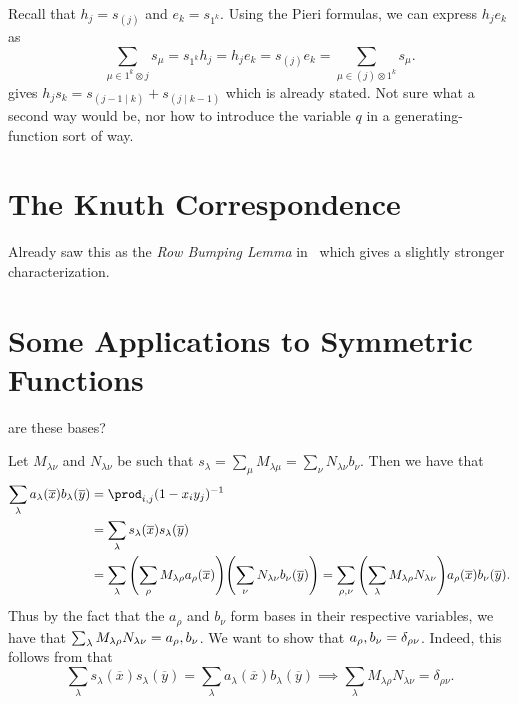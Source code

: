 \documentclass[letterpaper, 11pt, oneside]{book}
\begin{document}
\begin{sol}\label{ex:Manivel_1.2.15}
  Recall that $h_{j} = s_{(j)}$ and $e_{k} = s_{1^{k}}$.
  Using the Pieri formulas, we can express $h_{j}e_{k}$ as
  \[
       \sum_{\mu \in 1^{k} \otimes j} s_{\mu} = s_{1^{k}}h_{j} = h_{j}e_{k} = s_{(j)}e_{k} = \sum_{\mu \in (j) \otimes 1^{k}} s_{\mu}.
  \]
   gives $h_{j}s_{k} = s_{(j - 1 \mid k)} + s_{(j \mid k - 1)}$ which is already stated.
  Not sure what a second way would be, nor how to introduce the variable $q$ in a generating-function sort of way.
\end{sol}

\clearpage

\section{The Knuth Correspondence}

\begin{sol}\label{ex:Manivel_1.3.1}
  Already saw this as the \emph{Row Bumping Lemma} in~\cite{book:YT} which gives a slightly stronger characterization.
\end{sol}

\section{Some Applications to Symmetric Functions}

\begin{sol}\label{ex:Manivel_1.4.4}
   are these bases?

  Let $M_{\lambda \nu}$ and $N_{\lambda \nu}$ be such that $s_{\lambda} = \sum_{\mu} M_{\lambda \mu} = \sum_{\nu} N_{\lambda \nu} b_{\nu}$.
  Then we have that
  \begin{align*}
    \sum_{\lambda} a_{\lambda}(\overline{x}) b_{\lambda}(\overline{y}) &= \prod_{i, j} (1 - x_{i}y_{j})^{-1} \\
                                                                       &= \sum_{\lambda} s_{\lambda}(\overline{x})s_{\lambda}(\overline{y}) \\
                                                                       &= \sum_{\lambda} \pqty{\sum_{\rho} M_{\lambda \rho} a_{\rho}(\overline{x})} \pqty{\sum_{\nu} N_{\lambda \nu} b_{\nu}(\overline{y})} = \sum_{\rho, \nu} \pqty{\sum_{\lambda} M_{\lambda \rho} N_{\lambda \nu}} a_{\rho}(\overline{x}) b_{\nu}(\overline{y}).
  \end{align*}
  Thus by the fact that the $a_{\rho}$ and $b_{\nu}$ form bases in their respective variables, we have that $\sum_{\lambda} M_{\lambda \rho} N_{\lambda \nu} = \inner{a_{\rho}, b_{\nu}}$.
  We want to show that $\inner{a_{\rho}, b_{\nu}} = \delta_{\rho \nu}$.
  Indeed, this follows from that
  \[
    \sum_{\lambda} s_{\lambda}(\overline{x}) s_{\lambda}(\overline{y}) = \sum_{\lambda} a_{\lambda}(\overline{x}) b_{\lambda}(\overline{y}) \implies \sum_{\lambda} M_{\lambda \rho} N_{\lambda \nu} = \delta_{\rho \nu}.
  \]
\end{sol}

\printbibliography
\end{document}
